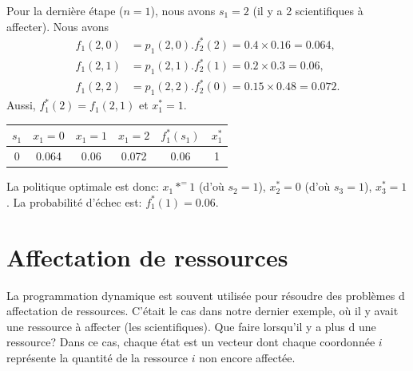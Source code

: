 \begin{example}
Pour la dernière étape ($n = 1$), nous avons $s_1 = 2$ (il y a 2 scientifiques à affecter).
Nous avons
\begin{align*}
 f_1(2,0) &= p_1(2,0).f_2^*(2) = 0.4 \times 0.16 = 0.064, \\
 f_1(2,1) &= p_1(2,1).f_2^*(1) = 0.2 \times 0.3 = 0.06, \\
 f_1(2,2) &= p_1(2,2).f_2^*(0) = 0.15 \times 0.48 = 0.072.
\end{align*}
Aussi, $f_1^*(2) = f_1(2,1)$ et $x_1^* = 1$.
\begin{center}
\begin{tabular}{|c|c|c|c|c|c|}
$s_1$ & $x_1 = 0$ & $x_1 = 1$ & $x_1 = 2$ & $f_1^*(s_1)$ & $x_1^*$ \\
\hline
0 & 0.064 & 0.06 & 0.072 & 0.06 & 1 \\
\end{tabular}
\end{center}
La politique optimale est donc:
$x_1*^ = 1$ (d'où $s_2 = 1$), $x_2^* = 0$ (d'où $s_3 = 1$), $x_3^* = 1$.
 La probabilité d'échec est: $f_1^*(1) = 0.06$.
\end{example}

\section{Affectation de ressources}

La programmation dynamique est souvent utilisée pour résoudre des problèmes d affectation de ressources.
C'était le cas dans notre dernier exemple, où il y avait une ressource à affecter (les scientifiques).
Que faire lorsqu'il y a plus d une ressource?
Dans ce cas, chaque état est un vecteur dont chaque coordonnée $i$ représente la quantité de la ressource $i$ non encore affectée.

